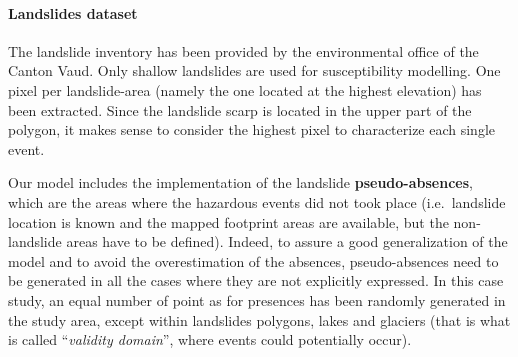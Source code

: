 \documentclass[
]{article}
\newenvironment{Shaded}{\begin{snugshade}}{\end{snugshade}}
\newcommand{\AttributeTok}[1]{\textcolor[rgb]{0.13,0.29,0.53}{#1}}
\newcommand{\CommentTok}[1]{\textcolor[rgb]{0.56,0.35,0.01}{\textit{#1}}}
\newcommand{\DocumentationTok}[1]{\textcolor[rgb]{0.56,0.35,0.01}{\textbf{\textit{#1}}}}
\newcommand{\FunctionTok}[1]{\textcolor[rgb]{0.13,0.29,0.53}{\textbf{#1}}}
\newcommand{\NormalTok}[1]{#1}
\newcommand{\OtherTok}[1]{\textcolor[rgb]{0.56,0.35,0.01}{#1}}
\newcommand{\SpecialCharTok}[1]{\textcolor[rgb]{0.81,0.36,0.00}{\textbf{#1}}}
\newcommand{\StringTok}[1]{\textcolor[rgb]{0.31,0.60,0.02}{#1}}
\begin{document}
\paragraph{Landslides dataset}\label{landslides-dataset}

The landslide inventory has been provided by the environmental office of the Canton Vaud.
Only shallow landslides are used for susceptibility modelling.
One pixel per landslide-area (namely the one located at the highest elevation) has been extracted.
Since the landslide scarp is located in the upper part of the polygon, it makes sense to consider the highest pixel to characterize each single event.

Our model includes the implementation of the landslide \textbf{pseudo-absences}, which are the areas where the hazardous events did not took place (i.e.~landslide location is known and the mapped footprint areas are available, but the non-landslide areas have to be defined).
Indeed, to assure a good generalization of the model and to avoid the overestimation of the absences, pseudo-absences need to be generated in all the cases where they are not explicitly expressed.
In this case study, an equal number of point as for presences has been randomly generated in the study area, except within landslides polygons, lakes and glaciers (that is what is called ``\emph{validity domain}'', where events could potentially occur).

\begin{Shaded}
\end{Shaded}
\end{document}
